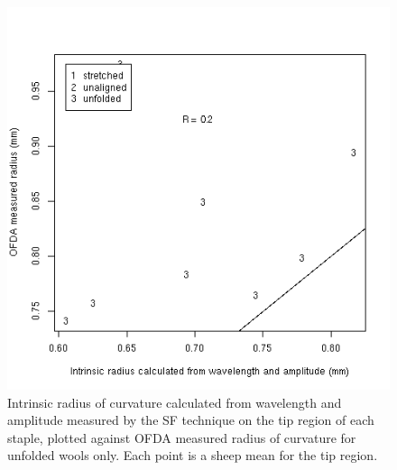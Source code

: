 %

\begin{figure}[!h]
  \centering
  \includegraphics[width=1.0\textwidth]{figwaradthetaunfoldsftip.png}
  \caption{Intrinsic radius of curvature calculated from wavelength and amplitude measured by the SF technique on the tip region of each staple, plotted against OFDA measured radius of curvature for unfolded wools only. Each point is a sheep mean for the tip region.}
  \label{fig:waradthetaunfoldsftip}
\end{figure}

%

